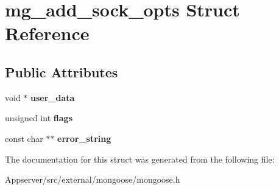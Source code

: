 \hypertarget{structmg__add__sock__opts}{}\section{mg\+\_\+add\+\_\+sock\+\_\+opts Struct Reference}
\label{structmg__add__sock__opts}
\subsection*{Public Attributes}
\begin{DoxyCompactItemize}
\item 
void $\ast$ {\bfseries user\+\_\+data}\hypertarget{structmg__add__sock__opts_af927a96c42e76f43592b510eca4e1f8e}{}\label{structmg__add__sock__opts_af927a96c42e76f43592b510eca4e1f8e}

\item 
unsigned int {\bfseries flags}\hypertarget{structmg__add__sock__opts_ac836b917617be7c0a38e6a322cdf9cff}{}\label{structmg__add__sock__opts_ac836b917617be7c0a38e6a322cdf9cff}

\item 
const char $\ast$$\ast$ {\bfseries error\+\_\+string}\hypertarget{structmg__add__sock__opts_a13c0a3d7dc05ad3873a03a7236735a50}{}\label{structmg__add__sock__opts_a13c0a3d7dc05ad3873a03a7236735a50}

\end{DoxyCompactItemize}


The documentation for this struct was generated from the following file\+:\begin{DoxyCompactItemize}
\item 
Appserver/src/external/mongoose/mongoose.\+h\end{DoxyCompactItemize}
